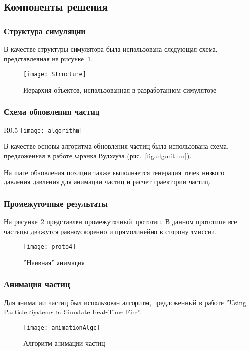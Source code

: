 \subsection{Компоненты решения}
\begin{frame}
\frametitle{Структура симуляции}
В качестве структуры симулятора была использована следующая схема,
представленная на рисунке~\ref{fig:simStructure}.
\begin{figure}[htb]
	\centering
	\texttt{[image: Structure]}
    \caption{Иерархия объектов, использованная в разработанном симуляторе}%
    \label{fig:simStructure}
\end{figure}
\end{frame}

\begin{frame}[t]
\frametitle{Схема обновления частиц}
\begin{wrapfigure}{R}{0.5\textwidth}
	\centering
	\texttt{[image: algorithm]}
    \caption{Схема обновления частиц в кадре}%
    \label{fig:algorithm}
\end{wrapfigure}
В качестве основы алгоритма обновления частиц была использована схема,
предложенная в работе Фрэнка Вудхауза (рис.~\ref{fig:algorithm}).

На шаге обновления позиции также выполняется генерация точек низкого давления
давления для анимации частиц и расчет траектории частиц.
\end{frame}

\begin{frame}
\frametitle{Промежуточные результаты}
На рисунке~\ref{fig:proto4} представлен промежуточный прототип. В данном
прототипе все частицы движутся равноускоренно и прямолинейно в сторону эмиссии.
\begin{figure}[htb]
	\centering
    \texttt{[image: proto4]}
    \caption{''Наивная'' анимация}%
    \label{fig:proto4}
\end{figure}
\end{frame}

\begin{frame}
\frametitle{Анимация частиц}
Для анимации частиц был использован алгоритм, предложенный
в работе ''Using Particle Systems to Simulate Real-Time Fire''.
\begin{figure}[htb]
	\centering
    \texttt{[image: animationAlgo]}
    \caption{Алгоритм анимации частиц}%
    \label{fig:animationAlgo}
\end{figure}
\end{frame}


